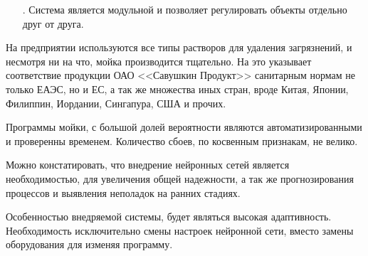 {\begin{itemize}[leftmargin=2.15cm, labelwidth=0.65cm, labelsep=0.0cm]
  	\item[\theitemcntr. ] Система является модульной и позволяет регулировать объекты отдельно друг от друга.
  	\addtocounter{itemcntr}{1}
  	
  	\setcounter{itemcntr}{1}
  \end{itemize}
  
  \par \redline На предприятии используются все типы растворов для удаления загрязнений, и несмотря ни на что, мойка производится тщательно. На это указывает соответствие продукции ОАО <<Савушкин Продукт>> санитарным нормам не только ЕАЭС, но и ЕС, а так же множества иных стран, вроде Китая, Японии, Филиппин, Иордании, Сингапура, США и прочих.
  
  \par \redline Программы мойки, с большой долей вероятности являются автоматизированными и проверенны временем. Количество сбоев, по косвенным признакам, не велико.
  
  \par \redline Можно констатировать, что внедрение нейронных сетей является необходимостью, для увеличения общей надежности, а так же прогнозирования процессов и выявления неполадок на ранних стадиях.  
  
  \par \redline Особенностью внедряемой системы, будет являться высокая адаптивность. Необходимость исключительно смены настроек нейронной сети, вместо замены оборудования для изменяя программу.
  
  \par 
}

%



\setcounter{subchaptercntr}{1}
\setcounter{formulacntr}{1}
\setcounter{imagecntr}{1}
\setcounter{tablecntr}{1}

